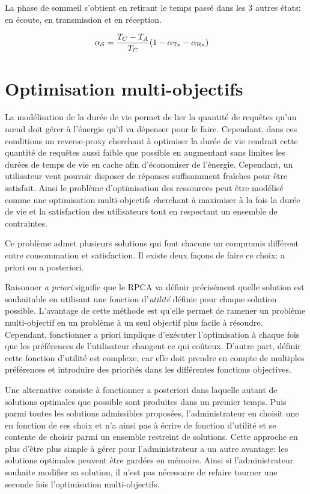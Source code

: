 La phase de sommeil s'obtient en retirant le temps passé dans les 3 autres états: en écoute, en transmission et en réception.

\begin{align}
  \alpha_{\mathcal{S}} &= \frac{T_C - T_A}{T_C}(1 - \alpha_{\textrm{Tx}} - \alpha_{\textrm{Rx}})
  \label{contikimac:eq:sleep}
\end{align}

\section{Optimisation multi-objectifs}
\label{cache:moo}

La modélisation de la durée de vie permet de lier la quantité de requêtes qu'un nœud doit gérer à l'énergie qu'il va dépenser pour le faire.
Cependant, dans ces conditions un reverse-proxy cherchant à optimiser la durée de vie rendrait cette quantité de requêtes aussi faible que possible en augmentant sans limites les durées de temps de vie en cache afin d'économiser de l'énergie.
Cependant, un utilisateur veut pouvoir disposer de réponses suffisamment fraîches pour être satisfait.
Ainsi le problème d'optimisation des ressources peut être modélisé comme une optimisation multi-objectifs cherchant à maximiser à la fois la durée de vie et la satisfaction des utilisateurs tout en respectant un ensemble de contraintes.

Ce problème admet plusieurs solutions qui font chacune un compromis différent entre consommation et satisfaction.
Il existe deux façons de faire ce choix: a priori ou a posteriori.

Raisonner \emph{a priori} signifie que le \ac{RPCA} va définir précisément quelle solution est souhaitable en utilisant une fonction d'\emph{utilité} définie pour chaque solution possible.
L'avantage de cette méthode est qu'elle permet de ramener un problème multi-objectif en un problème à un seul objectif plus facile à résoudre.
Cependant, fonctionner a priori implique d'exécuter l'optimisation à chaque fois que les préférences de l'utilisateur changent ce qui coûteux.
D'autre part, définir cette fonction d'utilité est complexe, car elle doit prendre en compte de multiples préférences et introduire des priorités dans les différentes fonctions objectives.

Une alternative consiste à fonctionner a posteriori dans laquelle autant de solutions optimales que possible sont produites dans un premier temps.
Puis parmi toutes les solutions admissibles proposées, l'administrateur en choisit une en fonction de ces choix et n'a ainsi pas à écrire de fonction d'utilité et se contente de choisir parmi un ensemble restreint de solutions.
Cette approche en plus d'être plus simple à gérer pour l'administrateur a un autre avantage: les solutions optimales peuvent être gardées en mémoire.
Ainsi si l'administrateur souhaite modifier sa solution, il n'est pas nécessaire de refaire tourner une seconde fois l'optimisation multi-objectifs.

